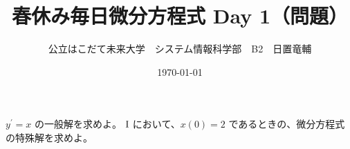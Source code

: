 \documentclass[dvipdfmx,uplatex]{jsarticle}
\title{春休み毎日微分方程式 Day 1（問題）}
\author{公立はこだて未来大学　システム情報科学部　B2　日置竜輔}
\date{\today}
\begin{document}
\maketitle

\begin{qparts}
    \qpart $ y ^ {\prime} = x $ の一般解を求めよ。
    \qpart $\rm I $ において、$ x(0) = 2 $ であるときの、微分方程式の特殊解を求めよ。
\end{qparts}
\end{document}
